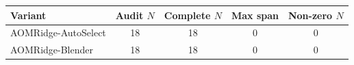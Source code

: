 \begin{tabularx}{\linewidth}{Xcccc}
\toprule
Variant & Audit $N$ & Complete $N$ & Max span & Non-zero $N$ \\
\midrule
AOMRidge-\allowbreak{}AutoSelect & 18 & 18 & 0 & 0 \\
AOMRidge-\allowbreak{}Blender & 18 & 18 & 0 & 0 \\
\bottomrule
\end{tabularx}
